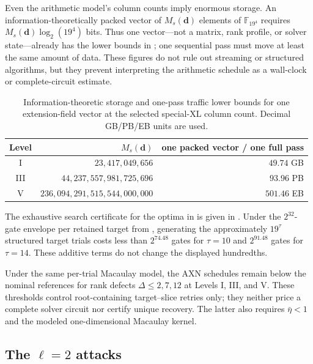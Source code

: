 \documentclass[11pt]{article}
\newcommand{\F}{\mathbb F}
\begin{document}
Even the arithmetic model's column counts imply enormous storage.  An
information-theoretically packed vector of $M_s(\mathbf d)$ elements of
$\F_{19^4}$ requires
$M_s(\mathbf d)\log_2(19^4)$ bits.  Thus one vector---not a matrix, rank
profile, or solver state---already has the lower bounds in
; one sequential pass must move at least the same
amount of data.  These figures do not rule out streaming or structured
algorithms, but they prevent interpreting the arithmetic schedule as a
wall-clock or complete-circuit estimate.

\begin{table}[tbp]
\centering
\caption{Information-theoretic storage and one-pass traffic lower bounds for
one extension-field vector at the selected special-XL column count.  Decimal
GB/PB/EB units are used.}
\label{tab:vector-storage}
\small
\begin{tabular}{@{}c r r@{}}
\toprule
Level & $M_s(\mathbf d)$ & one packed vector / one full pass\\
\midrule
I   & $23{,}417{,}049{,}656$          & $49.74$ GB\\
III & $44{,}237{,}557{,}981{,}725{,}696$ & $93.96$ PB\\
V   & $236{,}094{,}291{,}515{,}544{,}000{,}000$ & $501.46$ EB\\
\bottomrule
\end{tabular}
\end{table}

The exhaustive search certificate for the optima in  is
given in .  Under the $2^{32}$-gate envelope per retained target from
, generating the approximately $19^\tau$ structured
target trials costs less than $2^{74.48}$ gates for $\tau=10$ and
$2^{91.48}$ gates for $\tau=14$.  These additive terms do not change the
displayed hundredths.

Under the same per-trial Macaulay model, the AXN schedules remain below the
nominal references for rank defects $\Delta\le2,7,12$ at Levels I, III, and
V.  These thresholds control root-containing target--slice retries only; they
neither price a complete solver circuit nor certify unique recovery.  The
latter also requires $\bar\eta<1$ and the modeled one-dimensional Macaulay
kernel.

\subsection{The \texorpdfstring{$\ell=2$}{l=2} attacks}
\label{sec:l2-costs}
\end{document}
